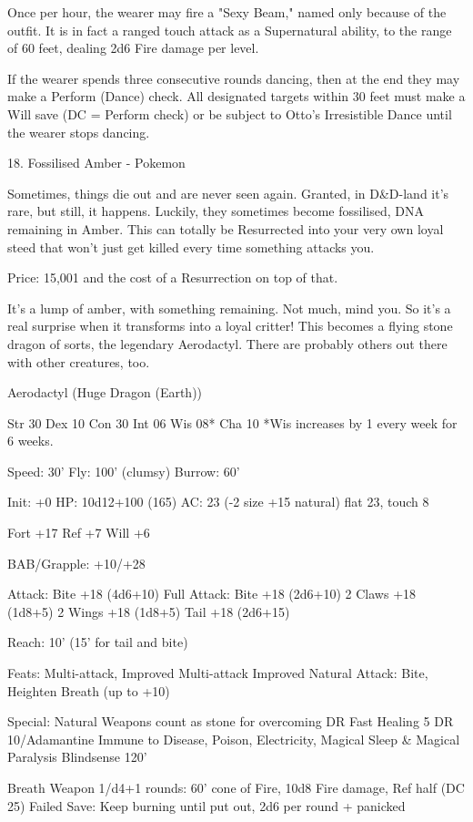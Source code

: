 \begin{multicols}{2}
Once per hour, the wearer may fire a "Sexy Beam," named only because of the outfit. It is in fact a ranged touch attack as a Supernatural ability, to the range of 60 feet, dealing 2d6 Fire damage per level.

If the wearer spends three consecutive rounds dancing, then at the end they may make a Perform (Dance) check. All designated targets within 30 feet must make a Will save (DC = Perform check) or be subject to Otto's Irresistible Dance until the wearer stops dancing.


18. Fossilised Amber - Pokemon

Sometimes, things die out and are never seen again. Granted, in D\&D-land it's rare, but still, it happens. Luckily, they sometimes become fossilised, DNA remaining in Amber. This can totally be Resurrected into your very own loyal steed that won't just get killed every time something attacks you.

Price: 15,001 and the cost of a Resurrection on top of that.

It's a lump of amber, with something remaining. Not much, mind you. So it's a real surprise when it transforms into a loyal critter! This becomes a flying stone dragon of sorts, the legendary Aerodactyl. There are probably others out there with other creatures, too.

Aerodactyl (Huge Dragon (Earth))

Str 30 Dex 10 Con 30 Int 06 Wis 08* Cha 10
*Wis increases by 1 every week for 6 weeks.

Speed: 30'
Fly: 100' (clumsy)
Burrow: 60'

Init: +0
HP: 10d12+100 (165)
AC: 23 (-2 size +15 natural)
flat 23, touch 8

Fort +17
Ref +7
Will +6

BAB/Grapple: +10/+28

Attack: Bite +18 (4d6+10)
Full Attack:
Bite +18 (2d6+10)
2 Claws +18 (1d8+5)
2 Wings +18 (1d8+5)
Tail +18 (2d6+15)

Reach: 10' (15' for tail and bite)

Feats:
Multi-attack, Improved Multi-attack
Improved Natural Attack: Bite, Heighten Breath (up to +10)

Special:
Natural Weapons count as stone for overcoming DR
Fast Healing 5
DR 10/Adamantine
Immune to Disease, Poison, Electricity, Magical Sleep \& Magical Paralysis
Blindsense 120'

Breath Weapon 1/d4+1 rounds:
60' cone of Fire, 10d8 Fire damage, Ref half (DC 25)
Failed Save: Keep burning until put out, 2d6 per round + panicked


\end{multicols}
